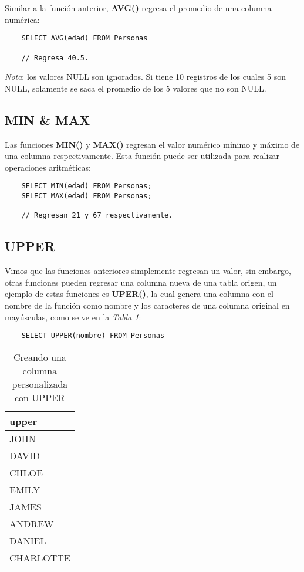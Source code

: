 Similar a la función anterior, \textbf{AVG()} regresa el promedio de una columna numérica:
\begin{lstlisting}
    SELECT AVG(edad) FROM Personas

    // Regresa 40.5.
\end{lstlisting}

\textit{Nota}: los valores NULL son ignorados. Si tiene 10 registros de los cuales 5 son NULL, solamente se saca el promedio de los 5 valores que no son NULL.


\subsection{MIN \& MAX}

Las funciones \textbf{MIN()} y \textbf{MAX()} regresan el valor numérico mínimo y máximo de una columna respectivamente. Esta función puede ser utilizada para realizar operaciones aritméticas:
\begin{lstlisting}
    SELECT MIN(edad) FROM Personas;
    SELECT MAX(edad) FROM Personas;

    // Regresan 21 y 67 respectivamente.
\end{lstlisting}


\subsection{UPPER}

Vimos que las funciones anteriores simplemente regresan un valor, sin embargo, otras funciones pueden regresar una columna nueva de una tabla origen, un ejemplo de estas funciones es \textbf{UPER()}, la cual genera una columna con el nombre de la función como nombre y los caracteres de una columna original en mayúsculas, como se ve en la \textit{Tabla \ref{tab: 15}}:
\begin{lstlisting}
    SELECT UPPER(nombre) FROM Personas
\end{lstlisting}
\begin{table}[H]
    \centering
    \caption{Creando una columna personalizada con UPPER}
    \label{tab: 15}
    \begin{tabular}{|l|}
        \hline
        \textbf{upper} \\
        \hline
        JOHN \\
        DAVID \\
        CHLOE \\
        EMILY \\
        JAMES \\
        ANDREW \\
        DANIEL \\
        CHARLOTTE \\
        \hline
    \end{tabular}
\end{table}

